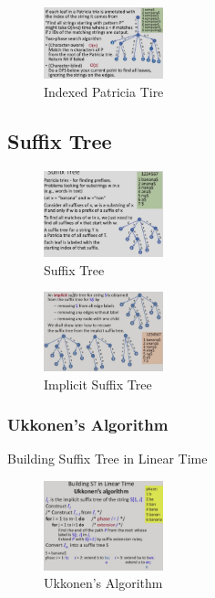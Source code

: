 \begin{figure}[H]
    \centering
    \includegraphics[width=0.309\textwidth]{pic/DAA7/Indexed Patricia Tire}
    \caption{Indexed Patricia Tire}
\end{figure}

\subsection{Suffix Tree}

\begin{figure}[H]
    \centering
    \includegraphics[width=0.309\textwidth]{pic/DAA7/Suffix Tree}
    \caption{Suffix Tree}
\end{figure}

\begin{figure}[H]
    \centering
    \includegraphics[width=0.309\textwidth]{pic/DAA7/Implicit Suffix Tree}
    \caption{Implicit Suffix Tree}
\end{figure}

\subsubsection{Ukkonen's Algorithm}
Building Suffix Tree in Linear Time

\begin{figure}[H]
    \centering
    \includegraphics[width=0.309\textwidth]{pic/DAA7/Ukkonen's Algorithm}
    \caption{Ukkonen's Algorithm}
\end{figure}

